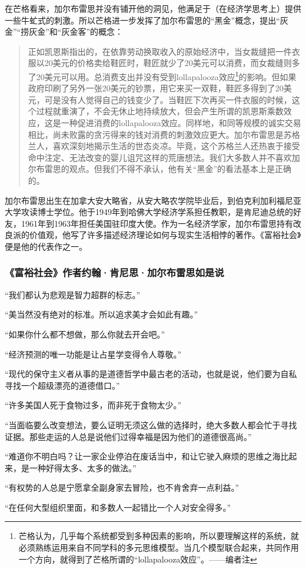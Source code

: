 在芒格看来，加尔布雷思并没有铺开他的洞见，他满足于（在经济学思考上）提供一些牛虻式的刺激。所以芒格进一步发挥了加尔布雷思的“黑金”概念，提出“灰金”“捞灰金”和“灰金客”的概念：
\par

\begin{quotation}
正如凯恩斯指出的，在依靠劳动换取收入的原始经济中，当女裁缝把一件衣服以20美元的价格卖给鞋匠时，鞋匠就少了20美元可以消费，而女裁缝则多了20美元可以用。总消费支出并没有受到lollapalooza效应\footnote{芒格认为，几乎每个系统都受到多种因素的影响，所以要理解这样的系统，就必须熟练运用来自不同学科的多元思维模型。当几个模型联合起来，共同作用一个方向，就得到了芒格所谓的“lollapalooza效应”。——编者注}的影响。但如果政府印刷了另外一张20美元的钞票，用它来买一双鞋，鞋匠多得到了20美元，可是没有人觉得自己的钱变少了。当鞋匠下次再买一件衣服的时候，这个过程就重演了，不会无休止地持续放大，但会产生所谓的凯恩斯乘数效应，这是一种促进消费的lollapalooza效应。同样地，和同等规模的诚实交易相比，尚未败露的贪污得来的钱对消费的刺激效应更大。加尔布雷思是苏格兰人，喜欢深刻地揭示生活的世态炎凉。毕竟，这个苏格兰人还热衷于接受命中注定、无法改变的婴儿诅咒这样的荒唐想法。我们大多数人并不喜欢加尔布雷思的观点。但我们不得不承认，他有关“黑金”的看法基本上是正确的。
\par
\end{quotation}

加尔布雷思出生在加拿大安大略省，从安大略农学院毕业后，到伯克利加利福尼亚大学攻读博士学位。他于1949年到哈佛大学经济学系担任教职，是肯尼迪总统的好友，1961年到1963年担任美国驻印度大使。作为一名经济学家，加尔布雷思持有改良派的价值观，他写了许多描述经济理论如何与现实生活相悖的著作。《富裕社会》便是他的代表作之一。
\par

\subsubsection*{《富裕社会》作者约翰·肯尼思·加尔布雷思如是说}

“我们都认为悲观是智力超群的标志。”
\par

“美当然没有绝对的标准。所以追求美才会如此有趣。”
\par

“如果你什么都不想做，那么你就去开会吧。”
\par

“经济预测的唯一功能是让占星学变得令人尊敬。”
\par

“现代的保守主义者从事的是道德哲学中最古老的活动，也就是说，他们要为自私寻找一个超级漂亮的道德借口。”
\par

“许多美国人死于食物过多，而非死于食物太少。”
\par

“当面临要么改变想法，要么证明无须这么做的选择时，绝大多数人都会忙于寻找证据。那些走运的人总是说他们过得幸福是因为他们的道德很高尚。”
\par

“难道你不明白吗？让一家企业停泊在废话当中，和让它驶入麻烦的思维之海比起来，是一种好得太多、太多的做法。”
\par

“有权势的人总是宁愿拿全副身家去冒险，也不肯舍弃一点利益。”
\par

“在任何大型组织里面，和多数人一起错比一个人对安全得多。”
\par
